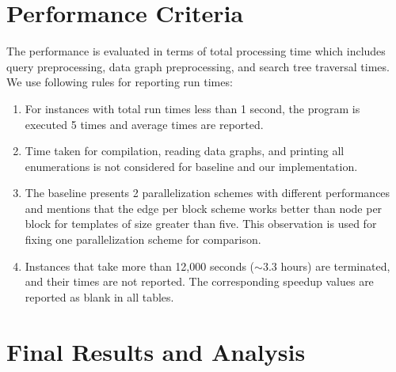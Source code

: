 {\section{Performance Criteria}
The performance is evaluated in terms of total processing time which includes query preprocessing, data graph preprocessing, and search tree traversal times.
We use following rules for reporting run times:\
\begin{enumerate}
    \item For instances with total run times less than 1 second, the program is executed 5 times and average times are reported.
    \item Time taken for compilation, reading data graphs, and printing all enumerations is not considered for baseline and our implementation.
    \item The baseline presents 2 parallelization schemes with different performances and mentions that the edge per block scheme works better than node per block for templates of size greater than five. This observation is used for fixing one parallelization scheme for comparison.
    \item Instances that take more than 12,000 seconds ($\sim 3.3$ hours) are terminated, and their times are not reported. The corresponding speedup values are reported as blank in all tables.
\end{enumerate}


\section{Final Results and Analysis}

}
